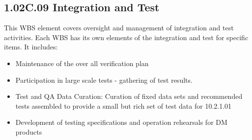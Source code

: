 \subsection{1.02C.09 Integration and Test}

This WBS element covers oversight and management of integration and test activities. Each WBS has its own elements of the integration and test for specific items. It includes:

\begin{itemize}

\item Maintenance of the over all verification plan 


\item Participation in large scale tests - gathering of test results. 

\item{Test and QA Data Curation: Curation of fixed data sets and
  recommended tests assembled to provide a small but rich set of test
  data for 10.2.1.01}
  
\item{Development of testing specifications and operation rehearsals
    for DM products}
    
\end{itemize}


